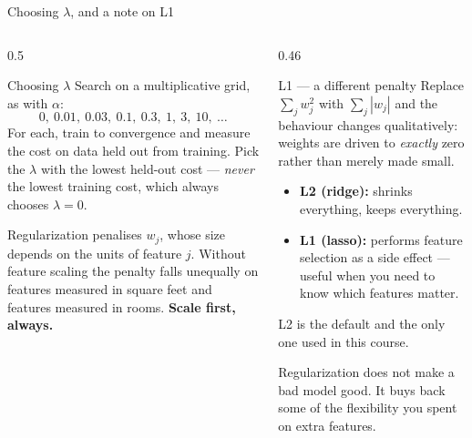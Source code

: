 \documentclass[aspectratio=169,10pt]{beamer}
\begin{document}
\begin{frame}{Choosing $\lambda$, and a note on L1}
  \footnotesize
  \begin{columns}[T,onlytextwidth]
    \begin{column}{0.5\textwidth}
      \begin{block}{Choosing $\lambda$}
        Search on a multiplicative grid, as with $\alpha$:
        \[ 0,\ 0.01,\ 0.03,\ 0.1,\ 0.3,\ 1,\ 3,\ 10,\ \dots \]
        For each, train to convergence and measure the cost on data held out from training.
        Pick the $\lambda$ with the lowest held-out cost --- \emph{never} the lowest training
        cost, which always chooses $\lambda=0$.
      \end{block}
      \begin{pitfall}
        Regularization penalises $w_j$, whose size depends on the units of feature $j$.
        Without feature scaling the penalty falls unequally on features measured in
        square feet and features measured in rooms. \textbf{Scale first, always.}
      \end{pitfall}
    \end{column}
    \begin{column}{0.46\textwidth}
      \begin{block}{L1 --- a different penalty}
        Replace $\sum_j w_j^2$ with $\sum_j |w_j|$ and the behaviour changes qualitatively:
        weights are driven to \emph{exactly} zero rather than merely made small.
        \begin{itemize}
          \item \textbf{L2 (ridge):} shrinks everything, keeps everything.
          \item \textbf{L1 (lasso):} performs feature selection as a side effect --- useful
                when you need to know which features matter.
        \end{itemize}
        L2 is the default and the only one used in this course.
      \end{block}
      \begin{keyidea}
        \footnotesize
        Regularization does not make a bad model good. It buys back some of the flexibility
        you spent on extra features.
      \end{keyidea}
    \end{column}
  \end{columns}
\end{frame}

\end{document}
